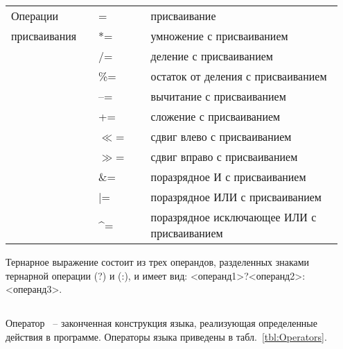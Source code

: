 \begin{center}
\begin{longtable}{|m{0.25\linewidth}|>{\centering}m{0.15\linewidth}|m{0.55\linewidth}|}
\hline  Операции        & = & присваивание \\ \cline{2-3}
присваивания            & *= & умножение с присваиванием \\ \cline{2-3}
                        & /= & деление с присваиванием \\ \cline{2-3} 
                        & \%= & остаток от деления с присваиванием \\ \cline{2-3}                        
                        & {--}= & вычитание с присваиванием \\ \cline{2-3}                           
                        & += & сложение с присваиванием \\   \cline{2-3} 
                        & $\ll$= & сдвиг влево с присваиванием \\   \cline{2-3} 
                        & $\gg$= & сдвиг вправо с присваиванием \\  \cline{2-3}   
                        & \&= & поразрядное И с присваиванием \\ \cline{2-3} 
                        & $\vert$= & поразрядное ИЛИ с присваиванием \\ \cline{2-3} 
                        & \textasciicircum= & поразрядное исключающее ИЛИ с присваиванием \\
\hline
\end{longtable}
\end{center}%

Тернарное выражение состоит из трех операндов, разделенных знаками тернарной операции (?) и (:), и имеет вид: <операнд1>?<операнд2>:<операнд3>.
\subsection{}

Оператор ~-- законченная конструкция языка, реализующая определенные действия
в программе. Операторы языка приведены в табл.~\ref{tbl:Operators}.

